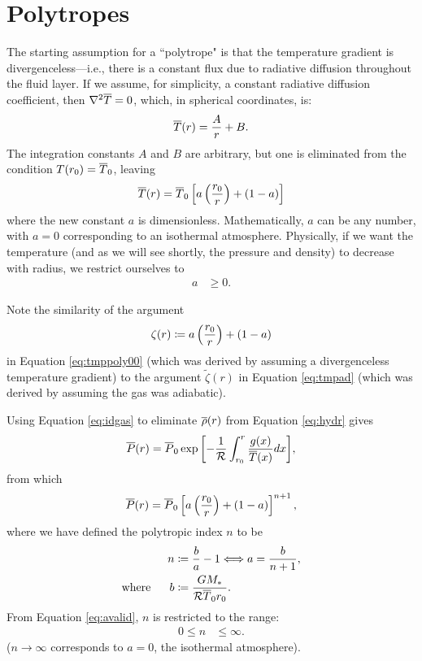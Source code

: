 \documentclass[12pt]{article}
\numberwithin{equation}{section}
\begin{document}
\section{Polytropes}
The starting assumption for a ``polytrope" is that the temperature gradient is divergenceless---i.e., there is a constant flux due to radiative diffusion throughout the fluid layer. If we assume, for simplicity, a constant radiative diffusion coefficient, then $\nabla^2\overline{T}=0$, which, in spherical coordinates, is: 
\begin{align*}
\overline{T}(r) = \frac{A}{r} + B.
\end{align*}
The integration constants $A$ and $B$ are arbitrary, but one is eliminated from the condition $T(r_0) = \overline{T}_0$, leaving
\begin{align}
\overline{T}(r) = \overline{T}_0 \left[a\left(\frac{r_0}{r}\right) + (1 - a)\right]
\label{eq:tmppoly00}
\end{align}
where the new constant $a$ is dimensionless. Mathematically, $a$ can be any number, with $a=0$ corresponding to an isothermal atmosphere. Physically, if we want the temperature (and as we will see shortly, the pressure and density) to decrease with radius, we restrict ourselves to 
\begin{align}\label{eq:avalid}
	a&\geq0. 
\end{align}

Note the similarity of the argument 
\begin{align}
\zeta(r)\coloneqq a\left(\frac{r_0}{r}\right) + (1-a)
\end{align}
in Equation \eqref{eq:tmppoly00} (which was derived by assuming a divergenceless temperature gradient) to the argument $\tilde{\zeta}(r)$ in Equation \eqref{eq:tmpad} (which was derived by assuming the gas was adiabatic). 

Using Equation \eqref{eq:idgas} to eliminate $\overline{\rho}(r)$ from Equation \eqref{eq:hydr} gives
\begin{align*}
\overline{P}(r) = \overline{P}_0\exp{\left[-\frac{1}{\mathcal{R}}\int_{r_0}^r\frac{g(x)}{\overline{T}(x)}dx\right]},
\end{align*}
from which
\begin{align*}
\overline{P}(r) = \overline{P}_0\left[a\left(\frac{r_0}{r}\right) + (1 - a)\right]^{n+1},
\end{align*}
where we have defined the polytropic index $n$ to be
\begin{align}
n&\coloneqq \frac{b}{a} - 1 \Longleftrightarrow a = \frac{b}{n+1},\label{eq:npoly}\\
\text{where}\ \ \ \ \  b&\coloneqq \frac{GM_*}{\mathcal{R} \overline{T}_0 r_0}.\label{eq:bpoly}
\end{align}
From Equation \eqref{eq:avalid}, $n$ is restricted to the range:
\begin{align}\label{eq:nvalid}
	0\leq n&\leq\infty. 
\end{align}
($n\rightarrow\infty$ corresponds to $a=0$, the isothermal atmosphere). 
\end{document}
